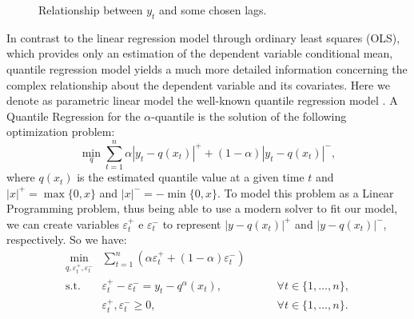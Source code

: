 \begin{figure}
\begin{minipage}[t]{\linewidth}
\begin{minipage}[b]{0.45\linewidth}
    \end{minipage}
  \end{minipage}
  \caption{Relationship between $y_t$ and some chosen lags.}
  \label{lags-icaraizinho}
\end{figure}

In contrast to the linear regression model through ordinary least squares (OLS), which provides only an estimation of the dependent variable conditional mean, quantile regression model yields a much more detailed information concerning the complex relationship about the dependent variable and its covariates. Here we denote as parametric linear model the well-known quantile regression model \cite{koenker2005quantile}. A Quantile Regression for the $\alpha$-quantile is the solution of the following optimization problem:
\begin{equation}
\min_{q}\sum_{t=1}^{n}\alpha|y_{t}-q(x_t)|^{+}+(1-\alpha)|y_{t}-q(x_t)|^{-},
\label{eq:linear-model}
\end{equation}
where $q(x_t)$ is the estimated quantile value at a given time $t$ and $|x|^+=\max\{0,x\}$ and $|x|^-=-\min\{0,x\}$. To model this problem as a Linear Programming problem, thus being able to use a modern solver to fit our model,  we can create variables $\varepsilon^+_t$ e $\varepsilon^-_t$ to represent $|y-q(x_t)|^+$ and $|y-q(x_t)|^-$, respectively. So we have:
\begin{equation}
\begin{aligned}\min_{q,\varepsilon_{t}^{+}, \varepsilon_{t}^{-}} & \sum_{t=1}^{n}\left(\alpha \varepsilon_{t}^{+}+(1-\alpha)\varepsilon_{t}^{-}\right) & \\
\mbox{s.t. } & \varepsilon_{t}^{+}-\varepsilon_{t}^{-}=y_{t}-q^\alpha(x_{t}), & \qquad\forall t \in \{1,\dots,n\},\\
& \varepsilon_t^+,\varepsilon_t^- \geq 0, & \qquad \forall t \in \{1,\dots,n\}.
\end{aligned}
\label{eq:qar-general}
\end{equation}




